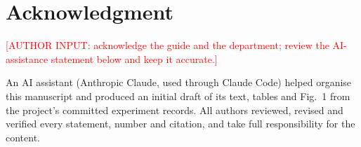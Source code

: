 \documentclass[conference,a4paper]{IEEEtran}
\newif\ifanonymous
\newcommand{\authorinput}[1]{\textcolor{red}{[AUTHOR INPUT: #1]}}
\begin{document}
\ifanonymous\else
\section*{Acknowledgment}
{\raggedright\authorinput{acknowledge the guide and the department; review the
AI-assistance statement below and keep it accurate.}\par}
An AI assistant (Anthropic Claude, used through Claude Code) helped organise this
manuscript and produced an initial draft of its text, tables and Fig.~1 from the
project's committed experiment records. All authors reviewed, revised and verified
every statement, number and citation, and take full responsibility for the content.
\fi



\end{document}
